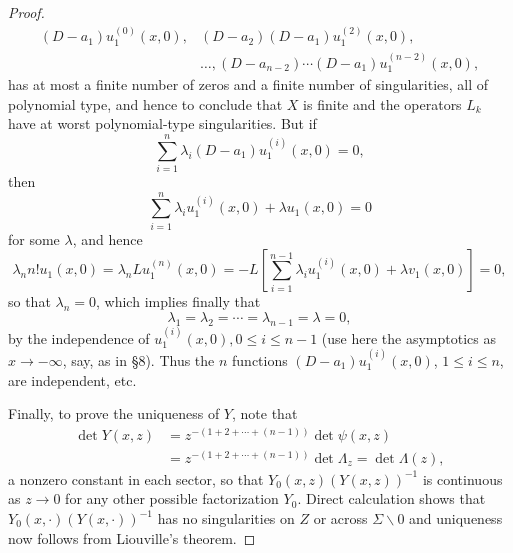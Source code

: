 \documentclass{surv-l}
\theoremstyle{plain}
\theoremstyle{definition}
\numberwithin{equation}{chapter}
\begin{document}
\begin{proof}
\begin{align*}
(D-a_{1})u_{1}^{(0)}(x, 0),&(D-a_{2})(D-a_{1})u_{1}^{(2)}(x, 0),\\
&\ldots,(D-a_{n-2})\cdots(D-a_{1})u_{1}^{(n-2)}(x, 0),
\end{align*}
has at most a finite number of zeros and a finite number of singularities, all of polynomial type, and hence to conclude that $X$ is finite and the operators $L_{k}$ have at worst polynomial-type singularities. But if
\begin{equation*}
\sum_{i=1}^{n}\lambda_{i}(D-a_{1})u_{1}^{(i)}(x, 0)=0,
\end{equation*}
then
\begin{equation*}
\sum_{i=1}^{n}\lambda_{i}u_{1}^{(i)}(x, 0)+\lambda u_{1}(x, 0)=0
\end{equation*}
for some $\lambda$, and hence
\begin{equation*}
\lambda_{n}n!u_{1}(x,0)=\lambda_{n}Lu_{1}^{(n)}(x,0)=-L\left[\sum_{i=1}^{n-1}\lambda_{i}u_{1}^{(i)}(x,0)+\lambda v_{1}(x, 0)\right]=0,
\end{equation*}
so that $\lambda_{n}=0$, which implies finally that
\begin{equation*}
\lambda_{1}=\lambda_{2}=\cdots=\lambda_{n-1}=\lambda=0,
\end{equation*}
by the independence of $u_{1}^{(i)}(x,0),0\leq i\leq n-1$ (use here the asymptotics as $ x\rightarrow-\infty$, say, as in \S8). Thus the $n$ functions $(D-a_{1})u_{1}^{(i)}(x, 0)$, $1\leq i\leq n$, are independent, etc.

Finally, to prove the uniqueness of $Y$, note that
\begin{align*}
\det Y(x, z)&=z^{-(1+2+\cdots+(n-1))}\det\psi(x, z)\\
&=z^{-(1+2+\cdots+(n-1))}\det\Lambda_{z}=\det\Lambda(z),
\end{align*}
a nonzero constant in each sector, so that $Y_{0}(x,z)(Y(x, z))^{-1}$ is continuous as $z\rightarrow 0$ for any other possible factorization $Y_{0}$. Direct calculation shows that $Y_{0}(x, \cdot)(Y(x, \cdot))^{-1}$ has no singularities on $Z$ or across $\Sigma\backslash 0$ and uniqueness now follows from Liouville's theorem.


\end{proof}
\end{document}
